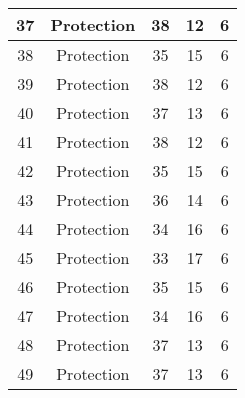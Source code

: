 \documentclass[results.tex]{subfiles}
\begin{document}
\begin{center}
\begin{tabular}{| c || c | c | c | c |}
            \hline
            37                      & Protection                   & 38                     & 12                      & 6                    \\
            \hline
            38                      & Protection                   & 35                     & 15                      & 6                    \\
            \hline
            39                      & Protection                   & 38                     & 12                      & 6                    \\
            \hline
            40                      & Protection                   & 37                     & 13                      & 6                    \\
            \hline
            41                      & Protection                   & 38                     & 12                      & 6                    \\
            \hline
            42                      & Protection                   & 35                     & 15                      & 6                    \\
            \hline
            43                      & Protection                   & 36                     & 14                      & 6                    \\
            \hline
            44                      & Protection                   & 34                     & 16                      & 6                    \\
            \hline
            45                      & Protection                   & 33                     & 17                      & 6                    \\
            \hline
            46                      & Protection                   & 35                     & 15                      & 6                    \\
            \hline
            47                      & Protection                   & 34                     & 16                      & 6                    \\
            \hline
            48                      & Protection                   & 37                     & 13                      & 6                    \\
            \hline
            49                      & Protection                   & 37                     & 13                      & 6                    \\
            \hline
        \end{tabular}
    \end{center}
\end{document}
